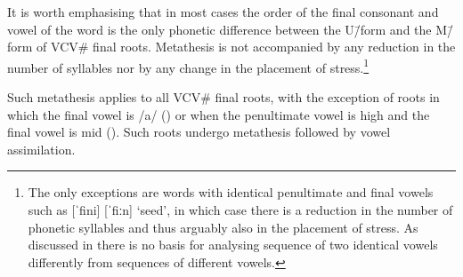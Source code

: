 It is worth emphasising that in most cases the order
of the final consonant and vowel of the word is the only phonetic difference
between the U\=/form and the M\=/form of VCV{\#} final roots.
Metathesis is not accompanied by any reduction in the number of syllables
nor by any change in the placement of stress.\footnote{
		The only exceptions are words with identical penultimate
		and final vowels such as  [ˈfini] {\ra}  [ˈfiːn] `seed',
		in which case there is a reduction in the number of phonetic syllables
		and thus arguably also in the placement of stress.
		As discussed in 
		there is no basis for analysing sequence of two identical vowels
		differently from sequences of different vowels.}

Such metathesis applies to all VCV{\#} final roots,
with the exception of roots in which the final vowel is /a/ ()
or when the penultimate vowel is high and the final vowel is mid ().
Such roots undergo metathesis followed by vowel assimilation.
